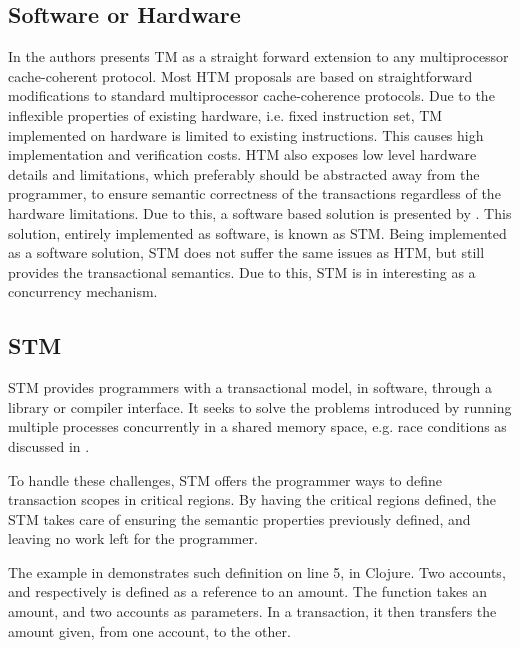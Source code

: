 \subsection{Software or Hardware}
In \cite{herlihy1993transactional} the authors presents \ac{TM} as a straight forward extension to any multiprocessor cache-coherent protocol. Most \ac{HTM} proposals are based on straightforward modifications to standard multiprocessor cache-coherence protocols\cite{scott2011sync}. Due to the inflexible properties of existing hardware, i.e. fixed instruction set, \ac{TM} implemented on hardware is limited to existing instructions. This causes high implementation and verification costs\cite{cascaval2008software}. \ac{HTM} also exposes low level hardware details and limitations\cite{scott2011sync}, which preferably should be abstracted away from the programmer, to ensure semantic correctness of the transactions regardless of the hardware limitations. Due to this, a software based solution is presented by \cite{shavit1997software}. This solution, entirely implemented as software, is known as \acl{STM}. Being implemented as a software solution, \ac{STM} does not suffer the same issues as \ac{HTM}, but still provides the transactional semantics. Due to this, \ac{STM} is in interesting as a concurrency mechanism.

\subsection{\acl{STM}}
\ac{STM} provides programmers with a transactional model, in software, through a library or compiler interface\cite{herlihy2011tm}. It seeks to solve the problems introduced by running multiple processes concurrently in a shared memory space, e.g. race conditions as discussed in . 

To handle these challenges, \ac{STM} offers the programmer ways to define transaction scopes in critical regions. By having the critical regions defined, the \ac{STM} takes care of ensuring the semantic properties previously defined, and leaving no work left for the programmer.

The example in  demonstrates such definition on line 5, in Clojure. Two accounts,  and  respectively is defined as a reference to an amount. The function  takes an amount, and two accounts as parameters. In a transaction, it then transfers the amount given, from one account, to the other.

